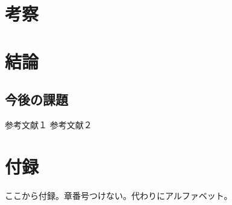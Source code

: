 \documentclass[11pt, a4paper, uplatex]{jsarticle}
\begin{document}
\section{考察}

\section{結論}

\subsection{今後の課題}

\vspace{1cm}

\clearpage

\begin{thebibliography}{9}
\bibitem{}
参考文献１
\bibitem{}
参考文献２
\end{thebibliography}
\clearpage
\def\thesection{}
\def\thesubsection{\Alph{subsection}}
\setcounter{subsection}{0}
\section{付録}
ここから付録。章番号つけない。代わりにアルファベット。
\end{document}

